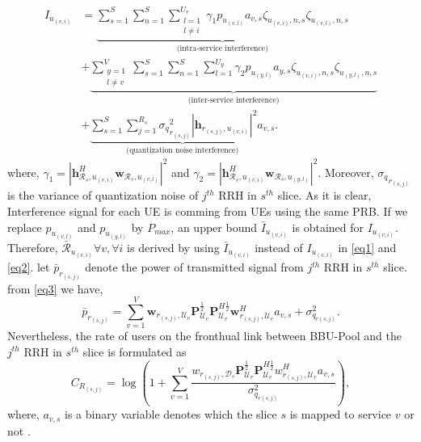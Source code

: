 \documentclass[conference]{IEEEtran}
\begin{document}
\begin{equation}
\begin{split}
 I_{u_{(v,i)}} &= 
 \underbrace{\sum_{s=1}^{S}\sum_{n=1}^{S}\sum_{\substack{l=1 \\ l\neq i}}^{{U}_v} \gamma_{1}  p_{u_{(v,l)}}a_{v,s}\zeta_{u_(v,i),n,s}\zeta_{u_(v,l),n,s}}_{\text{(intra-service interference)}}\\
&+ \underbrace{\sum_{\substack{y=1 \\ l\neq v}}^{V}\sum_{s=1}^{S}\sum_{n=1}^{S}\sum_{l=1}^{{U}_y} \gamma_{2}  p_{u_{(y,l)}}a_{y,s} \zeta_{u_(v,i),n,s}\zeta_{u_(y,l),n,s}}_{\text{(inter-service interference)}}\\
&+\underbrace{ \sum_{s=1}^{S} \sum_{j=1}^{{R}_s} {\sigma_q}_{r_{(s,j)}}^2 |\boldsymbol{h}_{r_{(s,j)}, u_{(v,i)}}|^2 a_{v,s}}_{\text{(quantization noise interference)}}.
\end{split}
\end{equation}
where, $\gamma_{1} =|\boldsymbol{h}_{\mathcal{R}_s, u_{(v,i)}}^H \boldsymbol{w}_{\mathcal{R}_{s},u_{(v,l)}}|^2$
and $\gamma_{2} =|\boldsymbol{h}_{\mathcal{R}_s, u_{(v,i)}}^H \boldsymbol{w}_{\mathcal{R}_{s},u_{(y,l)}}|^2$. Moreover,
${\sigma_q}_{r_{(s,j)}}$ is the variance of quantization noise of $j^{th}$ RRH in $s^{th}$ slice.
As it is clear, Interference signal for each UE is comming from UEs using the same PRB.
If we replace $p_{u_{(v,l)}}$ and $p_{u_{(y,l)}}$ by $P_{max}$, an upper bound $\bar{I}_{u_{(v,i)}}$ is obtained for $I_{u_{(v,i)}}$. Therefore, $\bar{\mathcal{R}}_{u_{(v,i)}} \forall v , \forall i$ is derived by using $\bar{I}_{u_{(v,i)}}$ instead of $I_{u_{(v,i)}}$ in  \eqref{eq1} and \eqref{eq2}.\newline
let $\bar{p}_{r_{(s,j)}}$ denote the power of transmitted signal from $j^{th}$ RRH in $s^{th}$ slice.
from \eqref{eq3} we have,
\begin{equation}
\bar{p}_{r_{(s,j)}} = \sum_{v=1}^{V}\boldsymbol{w}_{r_{(s,j)},\mathcal{U}_{v}} \boldsymbol{P}_{\mathcal{U}_v}^{\frac{1}{2}} \boldsymbol{P}_{\mathcal{U}_v}^{H \frac{1}{2}}   \boldsymbol{w}_{r_{(s,j)},\mathcal{U}_{v}}^H a_{v,s} + \sigma_{q_{r(s,j)}}^2.
\end{equation}
Nevertheless, the rate of users on the fronthual link between BBU-Pool and the $j^{th}$ RRH in $s^{th}$ slice is formulated as \cite{simeone2016cloud, 1111}
\begin{equation}
C_{R_{(s,j)}} = \log{(1+\sum_{v=1}^{V}\frac{w_{r_{(s,j)},\mathcal{D}_{s}} \boldsymbol{P}_{\mathcal{U}_v}^{\frac{1}{2}} \boldsymbol{P}_{\mathcal{U}_v}^{H \frac{1}{2}}   w_{r_{(s,j)},\mathcal{U}_{v}}^H a_{v,s}}{ \sigma_{q_{r(s,j)}}^2})},
\end{equation}
where, $a_{v,s}$ is a binary variable denotes which the slice $s$ is mapped to service $v$ or not .
\end{document}
